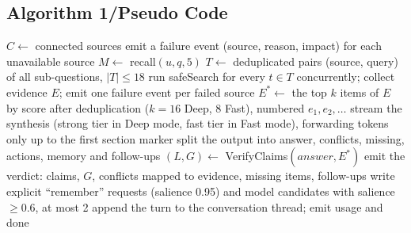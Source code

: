 \documentclass[oneside,a4paper,12pt]{report}
\begin{document}
  \subsection{Algorithm 1/Pseudo Code}
\begin{algorithm}[H]
\caption{Bounded agent run (runAgent)}
\label{alg:run}
$C \leftarrow$ connected sources\; emit a failure event (source, reason, impact) for each unavailable source\;
$M \leftarrow$ recall$(u, q, 5)$ 
$T \leftarrow$ deduplicated pairs (source, query) of all sub-questions, $|T| \le 18$\;
run safeSearch for every $t \in T$ concurrently; collect evidence $E$; emit one failure event per failed source\;
$E^{*} \leftarrow$ the top $k$ items of $E$ by score after deduplication ($k = 16$ Deep, $8$ Fast), numbered $e_1, e_2, \ldots$\;
stream the synthesis (strong tier in Deep mode, fast tier in Fast mode), forwarding tokens only up to the first section marker\;
split the output into answer, conflicts, missing, actions, memory and follow-ups\;
$(L, G) \leftarrow$ VerifyClaims$(\mathit{answer}, E^{*})$\;
emit the verdict: claims, $G$, conflicts mapped to evidence, missing items, follow-ups\;
write explicit ``remember'' requests (salience 0.95) and model candidates with salience $\ge 0.6$, at most 2\;
append the turn to the conversation thread; emit usage and done\;
\end{algorithm}
\end{document}
